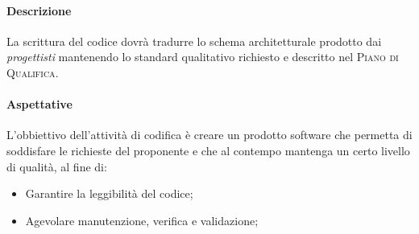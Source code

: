 \paragraph{Descrizione}

La scrittura del codice dovrà tradurre lo schema architetturale prodotto dai \emph{progettisti} mantenendo lo standard 
qualitativo richiesto e descritto nel \textsc{Piano di Qualifica}.

\paragraph{Aspettative}

L'obbiettivo dell'attività di codifica è creare un prodotto software che permetta di soddisfare le richieste del 
proponente e che al contempo mantenga un certo livello di qualità, al fine di:
\begin{itemize}
    \item Garantire la leggibilità del codice;
    \item Agevolare manutenzione, verifica e validazione;
\end{itemize}


